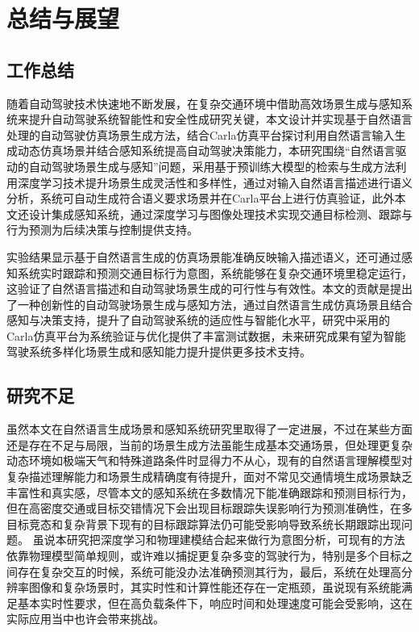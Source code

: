 \chapter{总结与展望}

\section{工作总结}

随着自动驾驶技术快速地不断发展，在复杂交通环境中借助高效场景生成与感知系统来提升自动驾驶系统智能性和安全性成研究关键，本文设计并实现基于自然语言处理的自动驾驶仿真场景生成方法，结合Carla仿真平台探讨利用自然语言输入生成动态仿真场景并结合感知系统提高自动驾驶决策能力，本研究围绕“自然语言驱动的自动驾驶场景生成与感知”问题，采用基于预训练大模型的检索与生成方法利用深度学习技术提升场景生成灵活性和多样性，通过对输入自然语言描述进行语义分析，系统可自动生成符合语义要求场景并在Carla平台上进行仿真验证，此外本文还设计集成感知系统，通过深度学习与图像处理技术实现交通目标检测、跟踪与行为预测为后续决策与控制提供支持。

实验结果显示基于自然语言生成的仿真场景能准确反映输入描述语义，还可通过感知系统实时跟踪和预测交通目标行为意图，系统能够在复杂交通环境里稳定运行，这验证了自然语言描述和自动驾驶场景生成的可行性与有效性。本文的贡献是提出了一种创新性的自动驾驶场景生成与感知方法，通过自然语言生成仿真场景且结合感知与决策支持，提升了自动驾驶系统的适应性与智能化水平，研究中采用的Carla仿真平台为系统验证与优化提供了丰富测试数据，未来研究成果有望为智能驾驶系统多样化场景生成和感知能力提升提供更多技术支持。

\section{研究不足}
虽然本文在自然语言生成场景和感知系统研究里取得了一定进展，不过在某些方面还是存在不足与局限，当前的场景生成方法虽能生成基本交通场景，但处理更复杂动态环境如极端天气和特殊道路条件时显得力不从心，现有的自然语言理解模型对复杂描述理解能力和场景生成精确度有待提升，面对不常见交通情境生成场景缺乏丰富性和真实感，尽管本文的感知系统在多数情况下能准确跟踪和预测目标行为，但在高密度交通或目标交错情况下会出现目标跟踪失误影响行为预测准确性，在多目标竞态和复杂背景下现有的目标跟踪算法仍可能受影响导致系统长期跟踪出现问题。
虽说本研究把深度学习和物理建模结合起来做行为意图分析，可现有的方法依靠物理模型简单规则，或许难以捕捉更复杂多变的驾驶行为，特别是多个目标之间存在复杂交互的时候，系统可能没办法准确预测其行为，最后，系统在处理高分辨率图像和复杂场景时，其实时性和计算性能还存在一定瓶颈，虽说现有系统能满足基本实时性要求，但在高负载条件下，响应时间和处理速度可能会受影响，这在实际应用当中也许会带来挑战。

